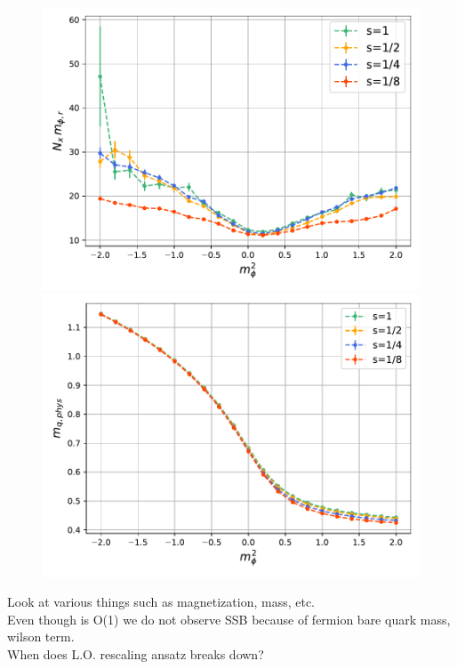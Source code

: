 \begin{figure}
    \begin{minipage}{0.45\textwidth}
        \includegraphics[scale=0.45]{figures/cooling/mass_scan/mphir.pdf}
    \end{minipage}
    \hfill 
    \begin{minipage}{0.45\textwidth}
        \includegraphics[scale=0.45]{figures/cooling/mass_scan/mqphys.pdf}
    \end{minipage}
\end{figure}

Look at various things such as magnetization, mass, etc. \\
Even though is O(1) we do not observe SSB because of fermion bare quark mass, wilson term. \\
When does L.O. rescaling ansatz breaks down?


